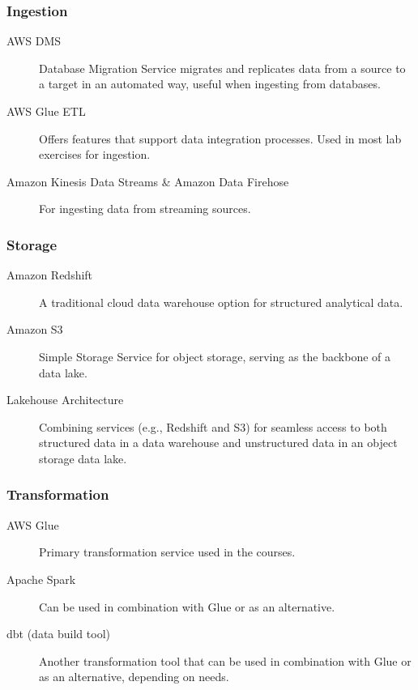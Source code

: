 \documentclass{article}
\begin{document}
\subsubsection{Ingestion}
\begin{description}
    \item[AWS DMS] Database Migration Service migrates and replicates data from a source to a target in an automated way, useful when ingesting from databases.

    \item[AWS Glue ETL] Offers features that support data integration processes. Used in most lab exercises for ingestion.

    \item[Amazon Kinesis Data Streams \& Amazon Data Firehose] For ingesting data from streaming sources.
\end{description}

\subsubsection{Storage}
\begin{description}
    \item[Amazon Redshift] A traditional cloud data warehouse option for structured analytical data.

    \item[Amazon S3] Simple Storage Service for object storage, serving as the backbone of a data lake.

    \item[Lakehouse Architecture] Combining services (e.g., Redshift and S3) for seamless access to both structured data in a data warehouse and unstructured data in an object storage data lake.
\end{description}

\subsubsection{Transformation}
\begin{description}
    \item[AWS Glue] Primary transformation service used in the courses.
    \item[Apache Spark] Can be used in combination with Glue or as an alternative.
    \item[dbt (data build tool)] Another transformation tool that can be used in combination with Glue or as an alternative, depending on needs.
\end{description}
\end{document}
